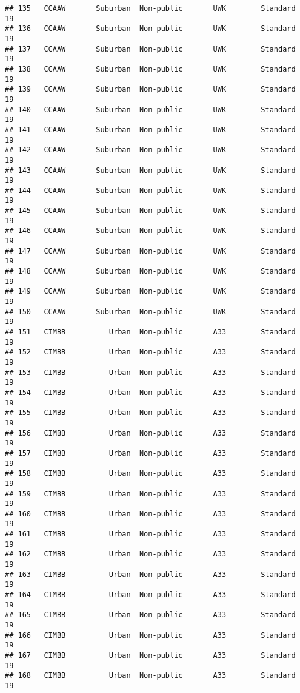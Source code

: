 \documentclass[
]{article}
\begin{document}
\begin{verbatim}
## 135   CCAAW       Suburban  Non-public       UWK        Standard        19
## 136   CCAAW       Suburban  Non-public       UWK        Standard        19
## 137   CCAAW       Suburban  Non-public       UWK        Standard        19
## 138   CCAAW       Suburban  Non-public       UWK        Standard        19
## 139   CCAAW       Suburban  Non-public       UWK        Standard        19
## 140   CCAAW       Suburban  Non-public       UWK        Standard        19
## 141   CCAAW       Suburban  Non-public       UWK        Standard        19
## 142   CCAAW       Suburban  Non-public       UWK        Standard        19
## 143   CCAAW       Suburban  Non-public       UWK        Standard        19
## 144   CCAAW       Suburban  Non-public       UWK        Standard        19
## 145   CCAAW       Suburban  Non-public       UWK        Standard        19
## 146   CCAAW       Suburban  Non-public       UWK        Standard        19
## 147   CCAAW       Suburban  Non-public       UWK        Standard        19
## 148   CCAAW       Suburban  Non-public       UWK        Standard        19
## 149   CCAAW       Suburban  Non-public       UWK        Standard        19
## 150   CCAAW       Suburban  Non-public       UWK        Standard        19
## 151   CIMBB          Urban  Non-public       A33        Standard        19
## 152   CIMBB          Urban  Non-public       A33        Standard        19
## 153   CIMBB          Urban  Non-public       A33        Standard        19
## 154   CIMBB          Urban  Non-public       A33        Standard        19
## 155   CIMBB          Urban  Non-public       A33        Standard        19
## 156   CIMBB          Urban  Non-public       A33        Standard        19
## 157   CIMBB          Urban  Non-public       A33        Standard        19
## 158   CIMBB          Urban  Non-public       A33        Standard        19
## 159   CIMBB          Urban  Non-public       A33        Standard        19
## 160   CIMBB          Urban  Non-public       A33        Standard        19
## 161   CIMBB          Urban  Non-public       A33        Standard        19
## 162   CIMBB          Urban  Non-public       A33        Standard        19
## 163   CIMBB          Urban  Non-public       A33        Standard        19
## 164   CIMBB          Urban  Non-public       A33        Standard        19
## 165   CIMBB          Urban  Non-public       A33        Standard        19
## 166   CIMBB          Urban  Non-public       A33        Standard        19
## 167   CIMBB          Urban  Non-public       A33        Standard        19
## 168   CIMBB          Urban  Non-public       A33        Standard        19

\end{verbatim}
\end{document}
